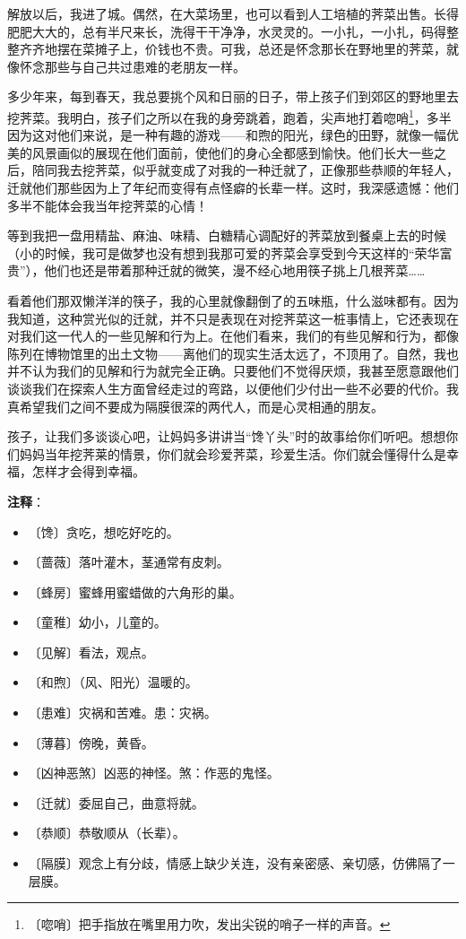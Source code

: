 \documentclass[12pt,UTF-8,openany]{ctexbook}
\begin{document}
\begin{normalsize}
    解放以后，我进了城。偶然，在大菜场里，也可以看到人工培植的荠菜出售。长得肥肥大大的，总有半尺来长，洗得干干净净，水灵灵的。一小扎，一小扎，码得整整齐齐地摆在菜摊子上，价钱也不贵。可我，总还是怀念那长在野地里的荠菜，就像怀念那些与自己共过患难的老朋友一样。
    
    多少年来，每到春天，我总要挑个风和日丽的日子，带上孩子们到郊区的野地里去挖荠菜。我明白，孩子们之所以在我的身旁跳着，跑着，尖声地打着唿哨\footnote{〔唿哨〕把手指放在嘴里用力吹，发出尖锐的哨子一样的声音。}，多半因为这对他们来说，是一种有趣的游戏——和煦的阳光，绿色的田野，就像一幅优美的风景画似的展现在他们面前，使他们的身心全都感到愉快。他们长大一些之后，陪同我去挖荠菜，似乎就变成了对我的一种迁就了，正像那些恭顺的年轻人，迁就他们那些因为上了年纪而变得有点怪癖的长辈一样。这时，我深感遗憾：他们多半不能体会我当年挖荠菜的心情！
    
    等到我把一盘用精盐、麻油、味精、白糖精心调配好的荠菜放到餐桌上去的时候（小的时候，我可是做梦也没有想到我那可爱的荠菜会享受到今天这样的“荣华富贵”），他们也还是带着那种迁就的微笑，漫不经心地用筷子挑上几根荠菜……
    
    看着他们那双懒洋洋的筷子，我的心里就像翻倒了的五味瓶，什么滋味都有。因为我知道，这种赏光似的迁就，并不只是表现在对挖荠菜这一桩事情上，它还表现在对我们这一代人的一些见解和行为上。在他们看来，我们的有些见解和行为，都像陈列在博物馆里的出土文物——离他们的现实生活太远了，不顶用了。自然，我也并不认为我们的见解和行为就完全正确。只要他们不觉得厌烦，我甚至愿意跟他们谈谈我们在探索人生方面曾经走过的弯路，以便他们少付出一些不必要的代价。我真希望我们之间不要成为隔膜很深的两代人，而是心灵相通的朋友。
    
    孩子，让我们多谈谈心吧，让妈妈多讲讲当“馋丫头”时的故事给你们听吧。想想你们妈妈当年挖荠莱的情景，你们就会珍爱荠菜，珍爱生活。你们就会懂得什么是幸福，怎样才会得到幸福。
    
\end{normalsize}


\newpage

\textbf{注释}：

\vspace{-1em}

\begin{itemize}
    \setlength\itemsep{-0.2em}
    \item 〔馋〕贪吃，想吃好吃的。
    \item 〔蔷薇〕落叶灌木，茎通常有皮刺。
    \item 〔蜂房〕蜜蜂用蜜蜡做的六角形的巢。
    \item 〔童稚〕幼小，儿童的。
    \item 〔见解〕看法，观点。
    \item 〔和煦〕（风、阳光）温暖的。
    \item 〔患难〕灾祸和苦难。患：灾祸。
    \item 〔薄暮〕傍晚，黄昏。
    \item 〔凶神恶煞〕凶恶的神怪。煞：作恶的鬼怪。
    \item 〔迁就〕委屈自己，曲意将就。
    \item 〔恭顺〕恭敬顺从（长辈）。
    \item 〔隔膜〕观念上有分歧，情感上缺少关连，没有亲密感、亲切感，仿佛隔了一层膜。
\end{itemize}
\end{document}
